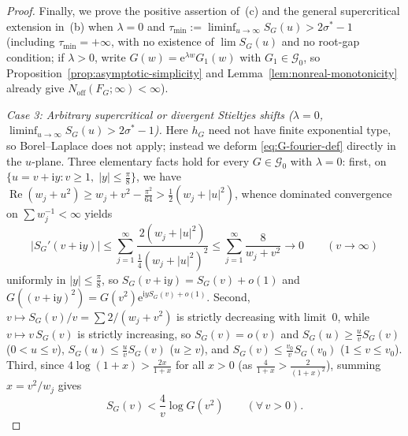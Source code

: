 \documentclass[11pt,a4paper,reqno]{amsart}
\theoremstyle{definition}
\theoremstyle{remark}
\numberwithin{equation}{section}
\newcommand{\ii}{\mathrm{i}}
\newcommand{\ee}{\mathrm{e}}
\DeclareMathOperator{\Reop}{Re}
\begin{document}
\begin{proof}
Finally, we prove the positive assertion of~(c) and the general supercritical extension in~(b) when $\lambda = 0$ and $\tau_{\min} := \liminf_{u\to\infty} S_G(u) > 2\sigma^* - 1$ (including $\tau_{\min} = +\infty$, with no existence of $\lim S_G(u)$ and no root-gap condition; if $\lambda > 0$, write $G(w) = \ee^{\lambda w}G_1(w)$ with $G_1 \in \mathcal{G}_0$, so Proposition~\ref{prop:asymptotic-simplicity} and Lemma~\ref{lem:nonreal-monotonicity} already give $N_{\mathrm{off}}(F_G; \infty) < \infty$).

\emph{Case 3: Arbitrary supercritical or divergent Stieltjes shifts ($\lambda = 0$, $\liminf_{u\to\infty} S_G(u) > 2\sigma^* - 1$).} Here $h_G$ need not have finite exponential type, so Borel--Laplace does not apply; instead we deform \eqref{eq:G-fourier-def} directly in the $u$-plane. Three elementary facts hold for every $G \in \mathcal{G}_0$ with $\lambda = 0$: first, on $\{u = v + \ii y : v \ge 1,\; |y| \le \frac{\pi}{8}\}$, we have $\Reop(w_j + u^2) \ge w_j + v^2 - \frac{\pi^2}{64} > \frac{1}{2}(w_j + |u|^2)$, whence dominated convergence on $\sum w_j^{-1} < \infty$ yields
\begin{equation}
  \bigl|S_G'(v + \ii y)\bigr|
  \le \sum_{j=1}^{\infty} \frac{2(w_j + |u|^2)}{\frac{1}{4}(w_j + |u|^2)^2}
  \le \sum_{j=1}^{\infty} \frac{8}{w_j + v^2} \longrightarrow 0
  \qquad (v \to \infty)
  \label{eq:SG-deriv-decay}
\end{equation}
uniformly in $|y| \le \frac{\pi}{8}$, so $S_G(v + \ii y) = S_G(v) + o(1)$ and $G((v + \ii y)^2) = G(v^2)\ee^{\ii y S_G(v) + o(1)}$. Second, $v \mapsto S_G(v)/v = \sum 2/(w_j + v^2)$ is strictly decreasing with limit~$0$, while $v \mapsto v\,S_G(v)$ is strictly increasing, so $S_G(v) = o(v)$ and $S_G(u) \ge \frac{u}{v}S_G(v)$ ($0 < u \le v$), $S_G(u) \le \frac{u}{v}S_G(v)$ ($u \ge v$), and $S_G(v) \le \frac{v_0}{v}S_G(v_0)$ ($1 \le v \le v_0$). Third, since $4\log(1+x) > \frac{2x}{1+x}$ for all $x > 0$ (as $\frac{4}{1+x} > \frac{2}{(1+x)^2}$), summing $x = v^2/w_j$ gives
\begin{equation}
  S_G(v) < \frac{4}{v}\log G(v^2)
  \qquad (\forall\,v > 0).
  \label{eq:SG-logG-ratio}
\end{equation}


\end{proof}
\end{document}
